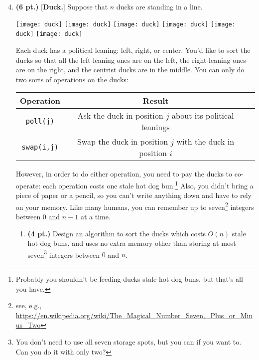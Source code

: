 \documentclass{article}
\newcommand{\pts}[1]{\textbf{(#1 pt.)}}
\begin{document}
\begin{enumerate}
\setcounter{enumi}{3}

\item \pts{6} [\textbf{Duck.}] Suppose that $n$ ducks are standing in a line.  
\begin{center}
\texttt{[image: duck]}
\hspace{1cm}
\texttt{[image: duck]}
\hspace{1cm}
\texttt{[image: duck]}
\hspace{1cm}
\texttt{[image: duck]}
\hspace{1cm}
\texttt{[image: duck]}
\hspace{1cm}
\texttt{[image: duck]}
\end{center}

Each duck has a political leaning: left, right, or center.  You'd like to sort the ducks so that all the left-leaning ones are on the left, the right-leaning ones are on the right, and the centrist ducks are in the middle.
You can only do two sorts of operations on the ducks:

\begin{center}
\begin{tabular}{|c|c|c|}
\hline
Operation & Result\\
\hline
\texttt{poll(j)} & Ask the duck in position $j$ about its political leanings \\ 
\hline
\texttt{swap(i,j)} & Swap the duck in position $j$ with the duck in position $i$ \\
\hline
\end{tabular}
\end{center}

However, in order to do either operation, you need to pay the ducks to co-operate: each operation costs one stale hot dog bun.\footnote{Probably you shouldn't be feeding ducks stale hot dog buns, but that's all you have.}  Also, you didn't bring a piece of paper or a pencil, so you can't write anything down and have to rely on your memory.  Like many humans, you can remember up to seven\footnote{see, e.g., \url{https://en.wikipedia.org/wiki/The_Magical_Number_Seven,_Plus_or_Minus_Two}} integers between $0$ and $n-1$ at a time.

\begin{enumerate}
\item \pts{4}
Design an algorithm to sort the ducks which costs $O(n)$ stale hot dog buns, and uses no extra memory other than storing at most seven\footnote{You don't need to use all seven storage spots, but you can if you want to.  Can you do it with only two?} integers between $0$ and $n$.


\end{enumerate}
\end{enumerate}
\end{document}
